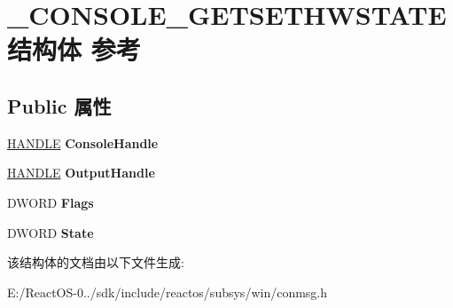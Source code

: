 \hypertarget{struct___c_o_n_s_o_l_e___g_e_t_s_e_t_h_w_s_t_a_t_e}{}\section{\+\_\+\+C\+O\+N\+S\+O\+L\+E\+\_\+\+G\+E\+T\+S\+E\+T\+H\+W\+S\+T\+A\+T\+E结构体 参考}
\label{struct___c_o_n_s_o_l_e___g_e_t_s_e_t_h_w_s_t_a_t_e}
\subsection*{Public 属性}
\begin{DoxyCompactItemize}
\item 
\mbox{\label{struct___c_o_n_s_o_l_e___g_e_t_s_e_t_h_w_s_t_a_t_e_aa5352d8fd6d82412e12896ef6337c505}} 
\hyperlink{interfacevoid}{H\+A\+N\+D\+LE} {\bfseries Console\+Handle}
\item 
\mbox{\label{struct___c_o_n_s_o_l_e___g_e_t_s_e_t_h_w_s_t_a_t_e_a7efe6125a07705d379bd992c3a1cd713}} 
\hyperlink{interfacevoid}{H\+A\+N\+D\+LE} {\bfseries Output\+Handle}
\item 
\mbox{\label{struct___c_o_n_s_o_l_e___g_e_t_s_e_t_h_w_s_t_a_t_e_a69f87fe9b94f6cee428b361feb09fcf4}} 
D\+W\+O\+RD {\bfseries Flags}
\item 
\mbox{\label{struct___c_o_n_s_o_l_e___g_e_t_s_e_t_h_w_s_t_a_t_e_a98facf5dae5312a2b10de2f659a706d3}} 
D\+W\+O\+RD {\bfseries State}
\end{DoxyCompactItemize}


该结构体的文档由以下文件生成\+:\begin{DoxyCompactItemize}
\item 
E\+:/\+React\+O\+S-\/0../sdk/include/reactos/subsys/win/conmsg.\+h\end{DoxyCompactItemize}
